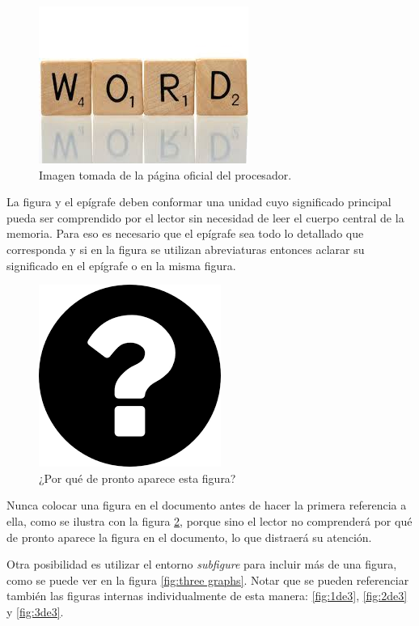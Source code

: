 \begin{figure}[htpb]
	\centering
	\includegraphics[scale=.3]{./Figures/word.jpeg}
	\caption{Imagen tomada de la página oficial del procesador\protect\footnotemark.}
	\label{fig:palabraIngles}
\end{figure}


La figura y el epígrafe deben conformar una unidad cuyo significado principal pueda ser comprendido por el lector sin necesidad de leer el cuerpo central de la memoria. Para eso es necesario que el epígrafe sea todo lo detallado que corresponda y si en la figura se utilizan abreviaturas entonces aclarar su significado en el epígrafe o en la misma figura.



\begin{figure}[ht]
	\centering
	\includegraphics[scale=.37]{./Figures/questionMark.png}
	\caption{¿Por qué de pronto aparece esta figura?}
	\label{fig:questionMark}
\end{figure}

Nunca colocar una figura en el documento antes de hacer la primera referencia a ella, como se ilustra con la figura \ref{fig:questionMark}, porque sino el lector no comprenderá por qué de pronto aparece la figura en el documento, lo que distraerá su atención.

Otra posibilidad es utilizar el entorno \textit{subfigure} para incluir más de una figura, como se puede ver en la figura \ref{fig:three graphs}. Notar que se pueden referenciar también las figuras internas individualmente de esta manera: \ref{fig:1de3}, \ref{fig:2de3} y \ref{fig:3de3}.
 
